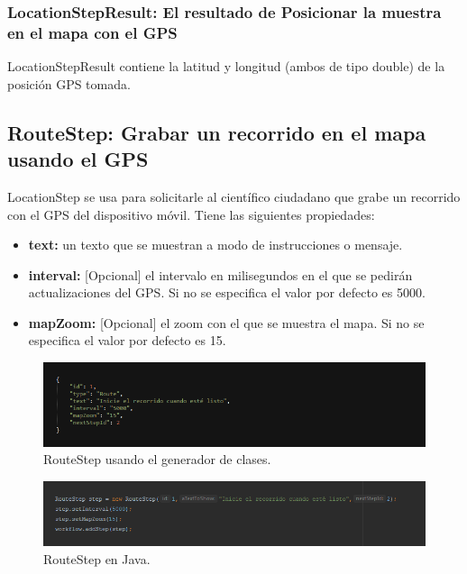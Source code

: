 \subsubsection{LocationStepResult: El resultado de Posicionar la muestra en el mapa con el GPS}
LocationStepResult contiene la latitud y longitud (ambos de tipo double) de la posición GPS tomada.





\subsection{RouteStep: Grabar un recorrido en el mapa usando el GPS}
LocationStep se usa para solicitarle al científico ciudadano que grabe un recorrido con el GPS del dispositivo móvil. Tiene las siguientes propiedades:

\begin{itemize}
\item \textbf{text:} un texto que se muestran a modo de instrucciones o mensaje.
\item \textbf{interval:} [Opcional] el intervalo en milisegundos en el que se pedirán actualizaciones del GPS. Si no se especifica el valor por defecto es 5000.
\item \textbf{mapZoom:} [Opcional] el zoom con el que se muestra el mapa. Si no se especifica el valor por defecto es 15.
\end{itemize}


\begin{figure}[H]
  \centering
    \includegraphics[scale=0.6]{50-anexos/C-steps/route_json.png} 
    \caption{RouteStep usando el generador de clases.}
\end{figure}	

\begin{figure}[H]
  \centering
    \includegraphics[scale=0.6]{50-anexos/C-steps/route_java.png} 
    \caption{RouteStep en Java.}
\end{figure}

